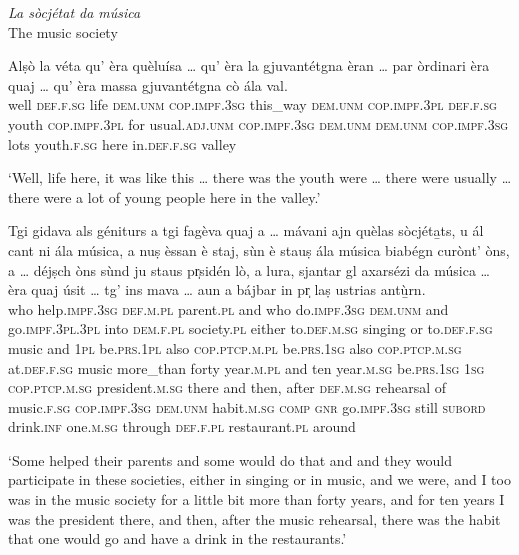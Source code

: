 \medskip

\textit{La sòcjétat da música}\\
The music society\\
\medskip

\begin{linenumbers}
\gll    Alṣò la véta qu' èra quèluísa … qu’ èra la gjuvantétgna èran … par òrdinari èra quaj … qu’ èra massa gjuvantétgna cò ála val. \\
 well \textsc{def.f.sg} life \textsc{dem.unm} \textsc{cop.impf.3sg} this\_way {} \textsc{dem.unm} \textsc{cop.impf.3pl} \textsc{def.f.sg} youth \textsc{cop.impf.3pl} {} for usual.\textsc{adj.unm} \textsc{cop.impf.3sg} \textsc{dem.unm} {} \textsc{dem.unm} \textsc{cop.impf.3sg} lots youth.\textsc{f.sg}  here in.\textsc{def.f.sg} valley\\
\end{linenumbers}
\medskip
\glt `Well, life here, it was like this … there was the youth were … there were usually … there were a lot of young people here in the valley.'
\medskip

\begin{linenumbers}
\gll    Tgi gidava als géniturs a tgi fagèva quaj a … mávani ajn quèlas sòcjéta̱ts, u ál cant ni ála música, a nuṣ èssan è staj, sùn è stauṣ ála música biabégn curònt' òns, a … déjṣch òns sùnd ju staus pr̩sidén lò, a lura, sjantar gl axarsézi da música … èra quaj úsit … tg’ ins mava … aun a bájbar in pr̩ laṣ ustrias antù̱rn.\\
who help.\textsc{impf.3sg} \textsc{def.m.pl} parent.\textsc{pl} and who do.\textsc{impf.3sg}  \textsc{dem.unm} and {} go.\textsc{impf.3pl.3pl} into \textsc{dem.f.pl} society.\textsc{pl} either  to.\textsc{def.m.sg} singing or to.\textsc{def.f.sg} music and \textsc{1pl} be.\textsc{prs.1pl} also \textsc{cop.ptcp.m.pl} be.\textsc{prs.1sg} also \textsc{cop.ptcp.m.sg} at.\textsc{def.f.sg} music more\_than forty year.\textsc{m.pl} and {} ten year.\textsc{m.sg} be.\textsc{prs.1sg} \textsc{1sg} \textsc{cop.ptcp.m.sg} president.\textsc{m.sg} there and then, after \textsc{def.m.sg} rehearsal of music.\textsc{f.sg} {} \textsc{cop.impf.3sg} \textsc{dem.unm} habit.\textsc{m.sg} {} \textsc{comp} \textsc{gnr} go.\textsc{impf.3sg} {} still \textsc{subord} drink.\textsc{inf} one.\textsc{m.sg} through \textsc{def.f.pl} restaurant.\textsc{pl} around\\
\end{linenumbers}
\medskip
\glt `Some helped their parents and some would do that and and they would participate in these societies, either in singing or in music, and we were, and I too was in the music society for a little bit more than forty years, and for ten years I was the president there, and then, after the music rehearsal, there was the habit that one would go and have a drink in the restaurants.'
\medskip

